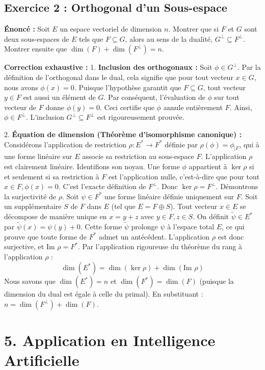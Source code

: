 \documentclass[11pt,a4paper]{report}
\begin{document}
\subsection{Exercice 2 : Orthogonal d'un Sous-espace}
\textbf{Énoncé :}
Soit $E$ un espace vectoriel de dimension $n$. Montrer que si $F$ et $G$ sont deux sous-espaces de $E$ tels que $F \subseteq G$, alors au sens de la dualité, $G^\perp \subseteq F^\perp$. Montrer ensuite que $\dim(F) + \dim(F^\perp) = n$.

\textbf{Correction exhaustive :}
1. \textbf{Inclusion des orthogonaux :}
   Soit $\phi \in G^\perp$. Par la définition de l'orthogonal dans le dual, cela signifie que pour tout vecteur $x \in G$, nous avons $\phi(x) = 0$.
   Puisque l'hypothèse garantit que $F \subseteq G$, tout vecteur $y \in F$ est aussi un élément de $G$.
   Par conséquent, l'évaluation de $\phi$ sur tout vecteur de $F$ donne $\phi(y) = 0$.
   Ceci certifie que $\phi$ annule entièrement $F$. Ainsi, $\phi \in F^\perp$. L'inclusion $G^\perp \subseteq F^\perp$ est rigoureusement prouvée.

2. \textbf{Équation de dimension (Théorème d'isomorphisme canonique) :}
   Considérons l'application de restriction $\rho : E^* \to F^*$ définie par $\rho(\phi) = \phi_{|F}$, qui à une forme linéaire sur $E$ associe sa restriction au sous-espace $F$.
   L'application $\rho$ est clairement linéaire.
   Identifions son noyau. Une forme $\phi$ appartient à $\ker \rho$ si et seulement si sa restriction à $F$ est l'application nulle, c'est-à-dire que pour tout $x \in F, \phi(x) = 0$. C'est l'exacte définition de $F^\perp$. Donc $\ker \rho = F^\perp$.
   Démontrons la surjectivité de $\rho$. Soit $\psi \in F^*$ une forme linéaire définie uniquement sur $F$. Soit un supplémentaire $S$ de $F$ dans $E$ (tel que $E = F \oplus S$). Tout vecteur $x \in E$ se décompose de manière unique en $x = y + z$ avec $y \in F, z \in S$. On définit $\tilde{\psi} \in E^*$ par $\tilde{\psi}(x) = \psi(y) + 0$. Cette forme $\tilde{\psi}$ prolonge $\psi$ à l'espace total $E$, ce qui prouve que toute forme de $F^*$ admet un antécédent. L'application $\rho$ est donc surjective, et $\text{Im }\rho = F^*$.
   Par l'application rigoureuse du théorème du rang à l'application $\rho$ :
   $$\dim(E^*) = \dim(\ker \rho) + \dim(\text{Im }\rho)$$
   Nous savons que $\dim(E^*) = n$ et $\dim(F^*) = \dim(F)$ (puisque la dimension du dual est égale à celle du primal).
   En substituant : $n = \dim(F^\perp) + \dim(F)$.

\section{5. Application en Intelligence Artificielle}
\end{document}
